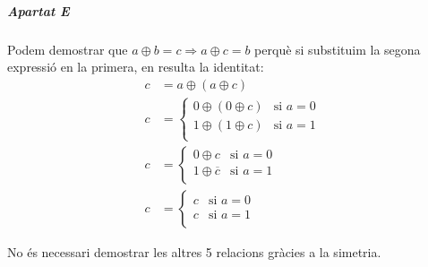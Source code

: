 \documentclass[catalan,border=15pt,class=scrartcl,multi=minipage]{standalone}
\begin{document}
\begin{minipage}{30em}
\subparagraph{Apartat E} Podem demostrar que $a \oplus b = c \Rightarrow a \oplus c = b$ perquè si substituim la segona expressió en la primera, en resulta la identitat:
%
\begin{align*}
  c &= a \oplus \left(a \oplus c\right) \\
  c &= \begin{cases}
    0 \oplus \left(0 \oplus c\right) & \text{si $a = 0$} \\
    1 \oplus \left(1 \oplus c\right) & \text{si $a = 1$} \\
  \end{cases} \\
  c &= \begin{cases}
    0 \oplus c & \text{si $a = 0$} \\
    1 \oplus \overline{c} & \text{si $a = 1$} \\
  \end{cases} \\
  c &= \begin{cases}
    c & \text{si $a = 0$} \\
    c & \text{si $a = 1$} \\
  \end{cases}
\end{align*}

No és necessari demostrar les altres 5 relacions gràcies a la simetria.

\end{minipage}
\end{document}
